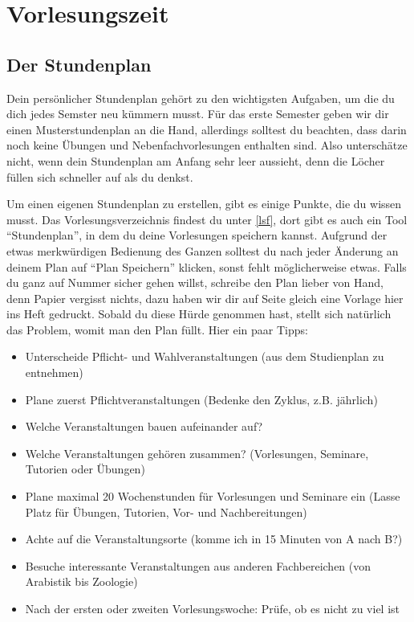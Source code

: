 ﻿\chapter{Vorlesungszeit}

\section{Der Stundenplan}

Dein persönlicher Stundenplan gehört zu den wichtigsten Aufgaben, um die du dich jedes Semster neu kümmern musst.
Für das erste Semester geben wir dir einen Musterstundenplan an die Hand, allerdings solltest du beachten, dass darin noch keine Übungen und Nebenfachvorlesungen enthalten sind. Also unterschätze nicht, wenn dein Stundenplan am Anfang sehr leer aussieht, denn die Löcher füllen sich schneller auf als du denkst.

Um einen eigenen Stundenplan zu erstellen, gibt es einige Punkte, die du wissen
musst. Das Vorlesungsverzeichnis findest du unter \ref{lsf}, dort gibt es auch
ein Tool ``Stundenplan'', in dem du deine Vorlesungen speichern kannst.
Aufgrund der etwas merkwürdigen Bedienung des Ganzen solltest du nach jeder
Änderung an deinem Plan auf ``Plan Speichern'' klicken, sonst fehlt
möglicherweise etwas. Falls du ganz auf Nummer sicher gehen willst, schreibe den
Plan lieber von Hand, denn Papier vergisst nichts, dazu haben wir dir auf Seite
\pageref{studenplan} gleich eine Vorlage hier ins Heft gedruckt. Sobald du
diese Hürde genommen hast, stellt sich natürlich das Problem, womit man den
Plan füllt. Hier ein paar Tipps:

\begin{itemize}
	\item Unterscheide Pflicht- und Wahlveranstaltungen (aus dem Studienplan zu entnehmen)
	\item Plane zuerst Pflichtveranstaltungen (Bedenke den Zyklus, z.B. jährlich)
	\item Welche Veranstaltungen bauen aufeinander auf?
	\item Welche Veranstaltungen gehören zusammen? (Vorlesungen, Seminare, Tutorien oder Übungen)
	\item Plane maximal 20 Wochenstunden für Vorlesungen und Seminare ein (Lasse Platz für Übungen, Tutorien, Vor- und Nachbereitungen)
	\item Achte auf die Veranstaltungsorte (komme ich in 15 Minuten von A nach B?)
	\item Besuche interessante Veranstaltungen aus anderen Fachbereichen (von Arabistik bis Zoologie)
	\item Nach der ersten oder zweiten Vorlesungswoche: Prüfe, ob es nicht zu viel ist
\end{itemize}

